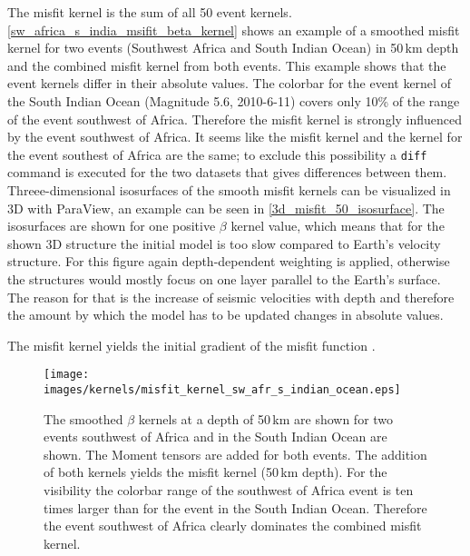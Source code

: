 The misfit kernel is the sum of all 50 event kernels. \autoref{sw_africa_s_india_msifit_beta_kernel} shows an example of a 
smoothed misfit kernel for two events (Southwest Africa and South Indian Ocean) in 50$\,$km depth 
and the combined misfit kernel from both events.
This example shows that the event kernels differ in their absolute values. 
The colorbar for the event kernel of the South Indian Ocean (Magnitude 5.6, 2010-6-11) covers only 10\% of 
the range of the event southwest of Africa.
Therefore the misfit kernel is strongly influenced by the event southwest of Africa.
It seems like the misfit kernel and the kernel for the event southest of Africa are the same;
to exclude this possibility a \texttt{diff} command is executed for the two datasets that gives 
differences between them.\\
%
Threee-dimensional isosurfaces of the smooth misfit kernels can be visualized in 3D with ParaView, 
an example can be seen in \autoref{3d_misfit_50_isosurface}.
The isosurfaces are shown for one positive $\beta$ kernel value, which means that for the shown 3D structure 
the initial model is too slow compared to Earth's velocity structure. 
For this figure again depth-dependent weighting is applied, 
otherwise the structures would mostly focus on one layer parallel to the Earth's surface.
The reason for that is the increase of seismic velocities with depth and therefore
the amount by which the model has to be updated changes in absolute values.

The misfit kernel yields the initial gradient of the misfit function \citep{Magnoni2012}.


\begin{figure}[h]
\begin{center}
\texttt{[image: images/kernels/misfit\_kernel\_sw\_afr\_s\_indian\_ocean.eps]}
\caption[Surface of a smooth misfit kernel for two events]
{The smoothed $\beta$ kernels at a depth of 50$\,$km are shown for two events southwest of Africa and 
in the South Indian Ocean are shown. The Moment tensors are added for both events.
The addition of both kernels yields the misfit kernel (50$\,$km depth).
For the visibility the colorbar range of the southwest of Africa event is ten times larger than for the event 
in the South Indian Ocean.
Therefore the event southwest of Africa clearly dominates the combined misfit kernel.}  
\label{sw_africa_s_india_msifit_beta_kernel}
\end{center}
\end{figure}


